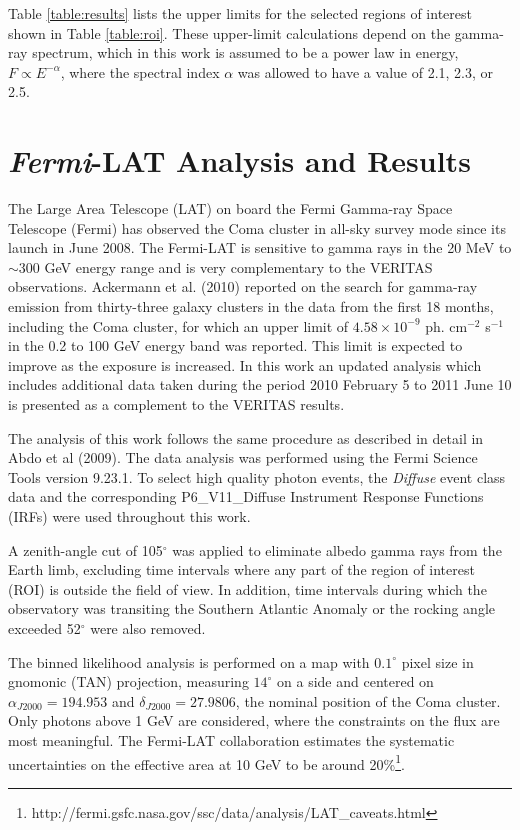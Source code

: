 \documentclass[12pt,manuscript]{aastex}
\def\Fermi{{\em Fermi}\xspace}
\begin{document}
Table \ref{table:results} lists the upper limits for the selected regions of interest shown in
Table \ref{table:roi}. These upper-limit calculations depend on the gamma-ray spectrum, which in
this work is assumed to be a power law in energy, $F\propto E^{-\alpha}$, where the spectral index
$\alpha$ was allowed to have a value of 2.1, 2.3, or 2.5.

%
%

\section{\Fermi-LAT Analysis and Results}
The Large Area Telescope (LAT) on board the Fermi Gamma-ray Space Telescope (Fermi) has observed
the Coma cluster in all-sky survey mode since its launch in June 2008. The Fermi-LAT is sensitive
to gamma rays in the 20 MeV to $\sim300$ GeV energy range and is very complementary to the VERITAS
observations. Ackermann et al. (2010) reported on the search for gamma-ray emission from
thirty-three galaxy clusters in the data from the first 18 months, including the Coma cluster, for
which an upper limit of $4.58\times10^{-9}$ ph. cm$^{-2}$ s$^{-1}$ in the 0.2 to 100 GeV energy band was reported. This limit is expected to improve as the exposure is increased. In this work an
updated analysis which includes additional data taken during the period 2010 February 5 to 2011 
June 10 is presented as a complement to the VERITAS results.

The analysis of this work follows the same procedure as described in detail in Abdo et al (2009).
The data analysis was performed using the Fermi Science Tools version 9.23.1. To select high
quality photon events, the \textit{Diffuse} event class data and the corresponding P6\_V11\_Diffuse
Instrument Response Functions (IRFs) were used throughout this work.

A zenith-angle cut of 105$^\circ$ was applied to eliminate albedo gamma rays from the Earth limb,
excluding time intervals where any part of the region of interest (ROI) is outside the field of
view. In addition, time intervals during which the observatory was transiting the Southern Atlantic Anomaly or the rocking angle exceeded 52$^\circ$ were also removed.

The binned likelihood analysis is performed on a map with $0.1^{\circ}$ pixel size in gnomonic (TAN)
projection, measuring $14^{\circ}$ on a side and centered on $\alpha_{J2000}=194.953$ and
$\delta_{J2000}=27.9806$, the nominal position of the Coma cluster. Only photons above 1 GeV are
considered, where the constraints on the flux are most meaningful. The Fermi-LAT collaboration
estimates the systematic uncertainties on the effective area at 10 GeV to be around
20\%\footnote{http://fermi.gsfc.nasa.gov/ssc/data/analysis/LAT\_caveats.html}.
\end{document}
